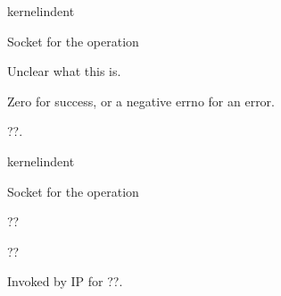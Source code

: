 \documentclass[letterpaper,10pt,english]{sphinxmanual}
\begin{document}
\begin{sphinxuseclass}{kernelindent}
\sphinxAtStartPar
{}
\begin{description}
\sphinxAtStartPar
Socket for the operation

\sphinxAtStartPar
Unclear what this is.

\end{description}

\sphinxAtStartPar
{}

\sphinxAtStartPar
Zero for success, or a negative errno for an error.

\end{sphinxuseclass}

\begin{fulllineitems}
\label{\detokenize{mtpimpl.c:c.MTP_diag_destroy}}
\pysigstartsignatures
\pysigstartmultiline
{}
\pysigstopmultiline
\pysigstopsignatures
\sphinxAtStartPar
??.

\end{fulllineitems}


\begin{sphinxuseclass}{kernelindent}
\sphinxAtStartPar
{}
\begin{description}
\sphinxAtStartPar
Socket for the operation

\sphinxAtStartPar
??

\end{description}

\sphinxAtStartPar
{}

\sphinxAtStartPar
??

\end{sphinxuseclass}

\begin{fulllineitems}
\label{\detokenize{mtpimpl.c:c.MTP_v4_early_demux}}
\pysigstartsignatures
\pysigstartmultiline
{}
\pysigstopmultiline
\pysigstopsignatures
\sphinxAtStartPar
Invoked by IP for ??.

\end{fulllineitems}
\end{document}
